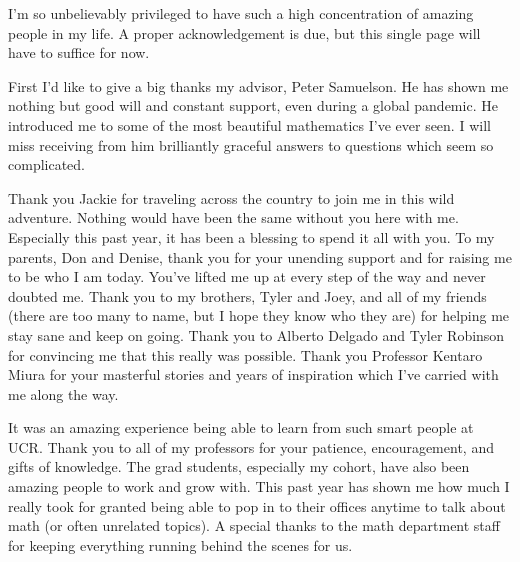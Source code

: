 \begin{acknowledgements}

I'm so unbelievably privileged to have such a high concentration of amazing people in my life. A proper acknowledgement is due, but this single page will have to suffice for now.

First I'd like to give a big thanks my advisor, Peter Samuelson. He has shown me nothing but good will and constant support, even during a global pandemic. He introduced me to some of the most beautiful mathematics I've ever seen. I will miss receiving from him brilliantly graceful answers to questions which seem so complicated. 

Thank you Jackie for traveling across the country to join me in this wild adventure. Nothing would have been the same without you here with me. Especially this past year, it has been a blessing to spend it all with you. To my parents, Don and Denise, thank you for your unending support and for raising me to be who I am today. You've lifted me up at every step of the way and never doubted me. Thank you to my brothers, Tyler and Joey, and all of my friends (there are too many to name, but I hope they know who they are) for helping me stay sane and keep on going. Thank you to Alberto Delgado and Tyler Robinson for convincing me that this really was possible. Thank you Professor Kentaro Miura for your masterful stories and years of inspiration which I've carried with me along the way.

It was an amazing experience being able to learn from such smart people at UCR. Thank you to all of my professors for your patience, encouragement, and gifts of knowledge. The grad students, especially my cohort, have also been amazing people to work and grow with. This past year has shown me how much I really took for granted being able to pop in to their offices anytime to talk about math (or often unrelated topics). A special thanks to the math department staff for keeping everything running behind the scenes for us.
\end{acknowledgements}